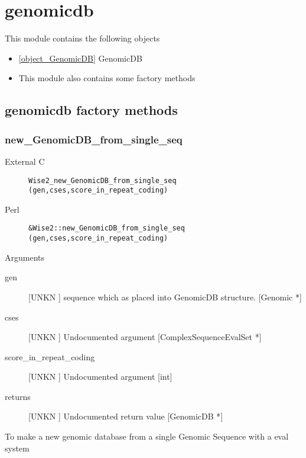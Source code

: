 \section{genomicdb}
\label{module_genomicdb}
This module contains the following objects

\begin{itemize}
\item \ref{object_GenomicDB} GenomicDB

\item This module also contains some factory methods
\end{itemize}
\subsection{genomicdb factory methods}
\subsubsection{new_GenomicDB_from_single_seq}
\begin{description}
\item[External C] {\tt Wise2_new_GenomicDB_from_single_seq (gen,cses,score_in_repeat_coding)}
\item[Perl] {\tt &Wise2::new_GenomicDB_from_single_seq (gen,cses,score_in_repeat_coding)}

\end{description}
Arguments
\begin{description}
\item[gen] [UNKN ] sequence which as placed into GenomicDB structure. [Genomic *]
\item[cses] [UNKN ] Undocumented argument [ComplexSequenceEvalSet *]
\item[score_in_repeat_coding] [UNKN ] Undocumented argument [int]
\item[returns] [UNKN ] Undocumented return value [GenomicDB *]
\end{description}
To make a new genomic database
from a single Genomic Sequence with a eval system


